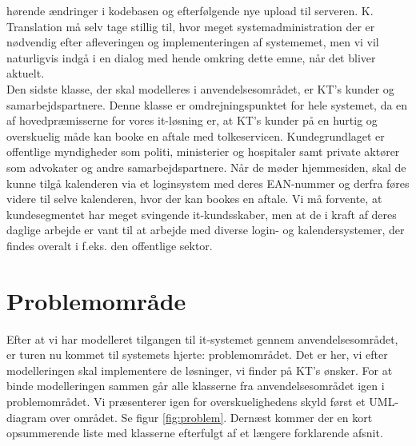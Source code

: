\documentclass[12pt]{article}
\begin{document}
hørende ændringer i kodebasen og efterfølgende nye upload til serveren. K.
Translation må selv tage stillig til, hvor meget systemadministration der er
nødvendig efter afleveringen og implementeringen af systememet, men vi vil
naturligvis indgå i en dialog med hende omkring dette emne, når det bliver
aktuelt. \\
Den sidste klasse, der skal modelleres i anvendelsesområdet, er KT's kunder og
samarbejdspartnere. Denne klasse er omdrejningspunktet for hele systemet, da
en af hovedpræmisserne for vores it-løsning er, at KT's kunder på en hurtig og
overskuelig måde kan booke en aftale med tolkeservicen. Kundegrundlaget er  
offentlige myndigheder som politi, ministerier og hospitaler samt private
aktører som advokater og andre samarbejdspartnere. Når de møder hjemmesiden, skal
de kunne tilgå kalenderen via et loginsystem med deres EAN-nummer og derfra
føres videre til selve kalenderen, hvor der kan bookes en aftale. Vi må
forvente, at kundesegmentet har meget svingende it-kundsskaber, men at de i
kraft af deres daglige arbejde er vant til at arbejde med diverse login- og 
kalendersystemer, der findes overalt i f.eks. den offentlige sektor. \\

\section{Problemområde}
Efter at vi har modelleret tilgangen til it-systemet gennem
anvendelsesområdet, er turen nu kommet til systemets hjerte: problemområdet. 
Det er her, vi efter modelleringen skal implementere de løsninger, vi finder
på KT's ønsker. For at binde modelleringen sammen går alle klasserne fra 
anvendelsesområdet igen i problemområdet. Vi præsenterer igen for
overskuelighedens skyld først et UML-diagram over området. Se figur 
\ref{fig:problem}. Dernæst kommer der en kort opsummerende liste med klasserne 
efterfulgt af et længere forklarende afsnit.  
\end{document}

